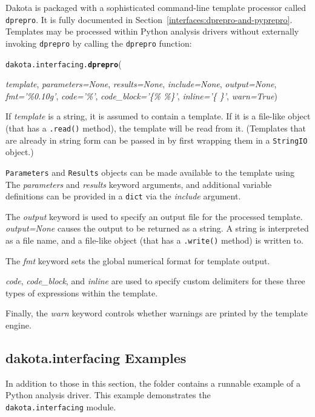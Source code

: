 Dakota is packaged with a sophisticated command-line template processor
called \texttt{dprepro}. It is fully documented in 
Section~\ref{interfaces:dprepro-and-pyprepro}. Templates may be processed 
within Python analysis drivers without externally invoking \texttt{dprepro} 
by calling the \texttt{dprepro} function:

\label{index:dakota.interfacing.dprepro}\texttt{dakota.interfacing.}\textbf{\texttt{dprepro}}({\emph{template}, \emph{parameters=None}, \emph{results=None}, \emph{include=None},
	\emph{output=None}, \emph{fmt='\%0.10g'}, \emph{code='\%'}, \emph{code\_block='\{\% \%\}'},
		\emph{inline='\{ \}'}, \emph{warn=True}){}

If \emph{template} is a string, it is assumed to contain a template. If it 
is a file-like object (that has a \texttt{.read()}
method), the template will be read from it. (Templates that are already in
string form can be passed in by first wrapping them in a \texttt{StringIO}
object.)

\texttt{Parameters} and \texttt{Results} objects can be made available to the
template using The \emph{parameters} and \emph{results} keyword arguments, and 
additional variable definitions can be provided in a \texttt{dict} via the
\emph{include} argument.

The \emph{output} keyword is used to specify an output file for the processed 
template. \emph{output=None} causes the output to be returned as a string. A
string is interpreted as a file name, and a file-like object (that has a 
\texttt{.write()} method) is written to.

The \emph{fmt} keyword sets the global numerical format for template output.

\emph{code}, \emph{code\_block}, and \emph{inline} are used to specify custom 
delimiters for these three types of expressions within the template.

Finally, the \emph{warn} keyword controls whether warnings are printed by the
template engine.

\subsection{dakota.interfacing Examples}

In addition to those in this section, the  folder contains a runnable example of a Python analysis driver. This example demonstrates the\\{\tt dakota.interfacing} module.

}
